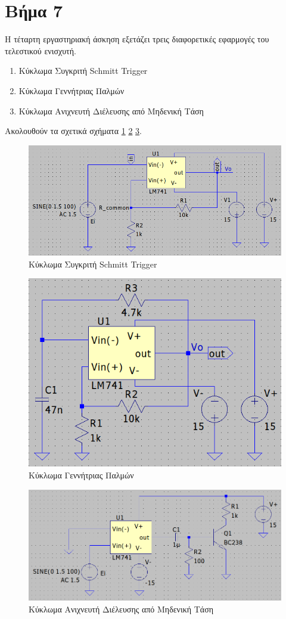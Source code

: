\documentclass[11pt,a4paper,twoside,onecolumn,openright,final]{memoir}
\begin{document}
\section{Βήμα 7}
Η τέταρτη εργαστηριακή άσκηση εξετάζει τρεις διαφορετικές εφαρμογές του τελεστικού ενισχυτή.
\begin{enumerate}
    \item Κύκλωμα Συγκριτή Schmitt Trigger
    \item Κύκλωμα Γεννήτριας Παλμών
    \item Κύκλωμα Ανιχνευτή Διέλευσης από Μηδενική Τάση
\end{enumerate}
Ακολουθούν τα σχετικά σχήματα \ref{fig:ex4circ1} \ref{fig:ex4circ2} \ref{fig:ex4circ3}.
\begin{figure}[H]
    \centering
    \includegraphics[width=0.8\linewidth]{figures/Exercise4_Schema_4-7.png}
    \caption{Κύκλωμα Συγκριτή Schmitt Trigger}
    \label{fig:ex4circ1}
\end{figure}
\begin{figure}[H]
    \centering
    \includegraphics[width=0.8\linewidth]{figures/Exercise4_Schema_4-8.png}
    \caption{Κύκλωμα Γεννήτριας Παλμών}
    \label{fig:ex4circ2}
\end{figure}
\begin{figure}[H]
    \centering
    \includegraphics[width=0.8\linewidth]{figures/Exercise4_Schema_4-9.png}
    \caption{Κύκλωμα Ανιχνευτή Διέλευσης από Μηδενική Τάση}
    \label{fig:ex4circ3}
\end{figure}
\end{document}
